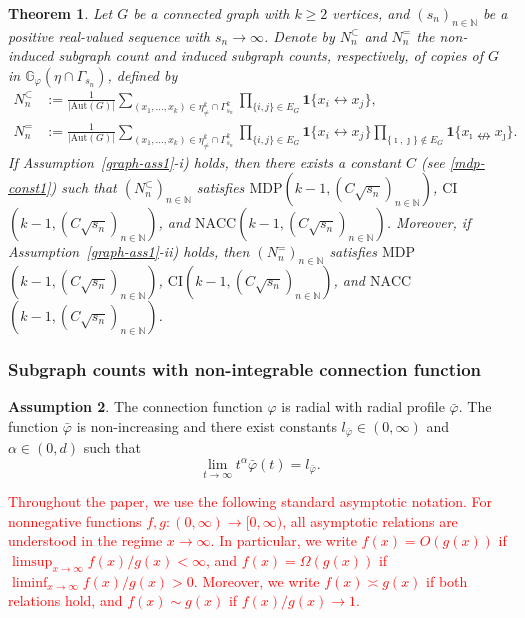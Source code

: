 \documentclass{article}
\newtheorem{theorem}{Theorem}[section]
\theoremstyle{definition}
\newtheorem{ass}[theorem]{Assumption}
\numberwithin{equation}{section}
\theoremstyle{remark}
\begin{document}
\begin{theorem}\label{thm:subgraphMDP}
	Let $G$ be a connected graph with $k\ge2$ vertices, and $(s_n)_{n\in\mathbb{N}}$ be a positive real-valued sequence with $s_n\to\infty$. 
Denote by $N_n^{\subset}$ and $N_n^{=}$ the non-induced subgraph count and induced subgraph counts, respectively, of copies of $G$ in 
$\mathbb{G}_{\varphi}(\eta\cap\Gamma_{s_n})$, defined by
\begin{align}
	N_n^{\subset}&:=\frac1{|\mathrm{Aut}(G)|}\sum_{(x_1,\dots,x_k)\in\eta^k_{\ne}\cap\Gamma_{s_n}^k}\prod_{\{i,j\}\in E_G}\mathbf{1}\{x_i\leftrightarrow x_j\},\\
	N_n^{=}&:=\frac1{|\mathrm{Aut}(G)|}\sum_{(x_1,\dots,x_k)\in\eta^k_{\ne}\cap\Gamma_{s_n}^k}\prod_{\{i,j\}\in E_G}
    \mathbf{1}\{x_i\leftrightarrow x_j\}\prod_{\{\imath,\jmath\}\notin E_G}\mathbf{1}\{x_{\imath}\nleftrightarrow x_{\jmath}\}.
\end{align}
If Assumption~\ref{graph-ass1}-i) holds, then there exists a constant $C$ (see \eqref{mdp-const1}) such that  
$(N_n^{\subset})_{n\in\mathbb{N}}$ satisfies 
\textbf{$\mathrm{MDP}$}$(k-1,(C\sqrt{s_n})_{n\in\mathbb{N}})$, \textbf{$\mathrm{CI}$}$(k-1, (C\sqrt{s_n})_{n \in \mathbb{N}})$, and \textbf{$\mathrm{NACC}$}$(k-1,(C\sqrt{s_n})_{n\in\mathbb{N}})$. 
Moreover, if Assumption~\ref{graph-ass1}-ii) holds, then 
$(N_n^{=})_{n\in\mathbb{N}}$ satisfies 
\textbf{$\mathrm{MDP}$}$(k-1,(C\sqrt{s_n})_{n\in\mathbb{N}})$, \textbf{$\mathrm{CI}$}$(k-1, (C\sqrt{s_n})_{n \in \mathbb{N}})$, and \textbf{$\mathrm{NACC}$}$(k-1,(C\sqrt{s_n})_{n\in\mathbb{N}})$. 
\end{theorem}
\subsubsection{Subgraph counts with non-integrable connection function}

\begin{ass}\label{bound-ass-1}
The connection function $\varphi$ is radial with radial profile $\bar{\varphi}$. The function $\bar{\varphi}$ is non-increasing and there exist constants $l_{\bar{\varphi}}\in(0,\infty)$ and $\alpha\in(0,d)$ such that
\begin{equation}
\lim_{t\to\infty} t^{\alpha} \bar{\varphi}(t)=l_{\bar{\varphi}}.
\end{equation}
\end{ass}

\textcolor{red}{Throughout the paper, we use the following standard asymptotic notation. 
For nonnegative functions $f,g:(0,\infty)\to[0,\infty)$, all asymptotic relations are understood in the regime $x\to\infty$. In particular, we write $f(x)=O(g(x))$ if $\limsup_{x\to\infty} f(x)/g(x)<\infty$, and $f(x)=\Omega(g(x))$ if $\liminf_{x\to\infty} f(x)/g(x)>0$. Moreover, we write $f(x)\asymp g(x)$ if both relations hold, and $f(x)\sim g(x)$ if $f(x)/g(x)\to 1$.
}
\end{document}
